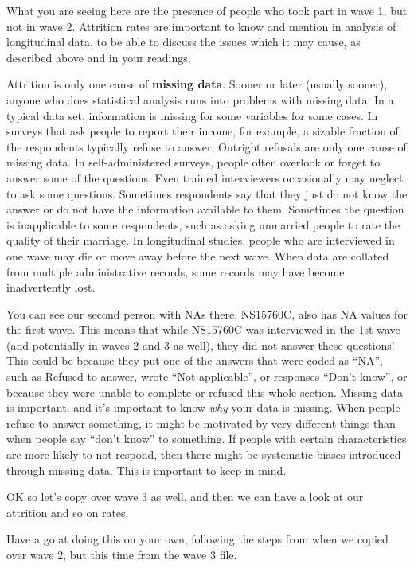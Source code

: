 \documentclass[]{book}
\theoremstyle{definition}
\theoremstyle{definition}
\theoremstyle{definition}
\theoremstyle{remark}
\begin{document}
What you are seeing here are the presence of people who took part in
wave 1, but not in wave 2. Attrition rates are important to know and
mention in analysis of longitudinal data, to be able to discuss the
issues which it may cause, as described above and in your readings.

Attrition is only one cause of \textbf{missing data}. Sooner or later
(usually sooner), anyone who does statistical analysis runs into
problems with missing data. In a typical data set, information is
missing for some variables for some cases. In surveys that ask people to
report their income, for example, a sizable fraction of the respondents
typically refuse to answer. Outright refusals are only one cause of
missing data. In self-administered surveys, people often overlook or
forget to answer some of the questions. Even trained interviewers
occasionally may neglect to ask some questions. Sometimes respondents
say that they just do not know the answer or do not have the information
available to them. Sometimes the question is inapplicable to some
respondents, such as asking unmarried people to rate the quality of
their marriage. In longitudinal studies, people who are interviewed in
one wave may die or move away before the next wave. When data are
collated from multiple administrative records, some records may have
become inadvertently lost.

You can see our second person with NAs there, NS15760C, also has NA
values for the first wave. This means that while NS15760C was
interviewed in the 1st wave (and potentially in waves 2 and 3 as well),
they did not answer these questions! This could be because they put one
of the answers that were coded as ``NA'', such as Refused to answer,
wrote ``Not applicable'', or responses ``Don't know'', or because they
were unable to complete or refused this whole section. Missing data is
important, and it's important to know \emph{why} your data is missing.
When people refuse to answer something, it might be motivated by very
different things than when people say ``don't know'' to something. If
people with certain characteristics are more likely to not respond, then
there might be systematic biases introduced through missing data. This
is important to keep in mind.

 OK so let's copy over wave 3 as well, and then we can have a look at
our attrition and so on rates.

Have a go at doing this on your own, following the steps from when we
copied over wave 2, but this time from the wave 3 file.
\end{document}
